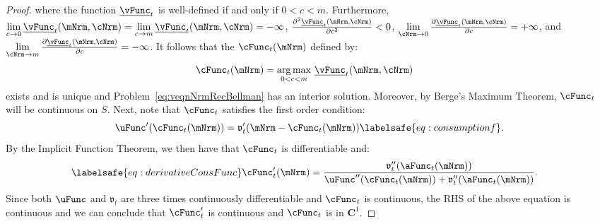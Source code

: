 \documentclass[\econtexRoot/BufferStockTheory]{subfiles}
\begin{document}
\begin{proof}
where the function $\underline{\vFunc}_{t}$ is well-defined if and only if $0<c<m$.
Furthermore,
$\lim\limits_{c \rightarrow
  0}\underline{\vFunc}_{t}(\mNrm,\cNrm)=\lim\limits_{c\rightarrow m} \underline{\vFunc}_{t}(\mNrm,\cNrm)=-\infty $, $\frac{\partial ^{2}\underline{\vFunc}_{t}(\mNrm,\cNrm)}{\partial c^{2}}%
<0$, $\lim\limits_{\cNrm \rightarrow 0}\frac{\partial \underline{\vFunc}_{t}(\mNrm,\cNrm)}{\partial c}%
=+\infty $, and $\lim\limits_{\cNrm\rightarrow m} \frac{\partial \underline{\vFunc}_{t}(\mNrm,\cNrm)}{%
  \partial c}=-\infty $.
It follows that the $\cFunc_{t}(\mNrm)$ defined by:
\begin{equation}\begin{gathered}\begin{aligned}
      \cFunc_{t}(\mNrm)  & = \underset{0<c<m}{\arg \max }~\underline{\vFunc}_{t}(\mNrm,\cNrm)
    \end{aligned}\end{gathered}\end{equation}
exists and is unique and Problem~\eqref{eq:veqnNrmRecBellman} has an interior
solution.
Moreover, by Berge's Maximum Theorem, $\cFunc_{t}$ will be continuous on $S$.
Next, note that $\cFunc_{t}$ satisfies the first order condition:
%
%
%
\begin{equation}
  \uFunc^{\prime }(\cFunc_{t}(\mNrm))=\mathfrak{v}_{t}^{\prime }(\mNrm-\cFunc_{t}(\mNrm))  \labelsafe{eq:consumptionf}.
\end{equation}
%
%
By the Implicit Function Theorem, we then have that $\cFunc_{t}$ is differentiable and:
%
%
\begin{equation}\labelsafe{eq:derivativeConsFunc}\begin{gathered}\begin{aligned}
      \cFunc_{t}^{\prime }(\mNrm)  & = \frac{\mathfrak{v}_{t}^{\prime \prime }({\aFunc}_{t}(\mNrm))  }{\uFunc^{\prime \prime }(\cFunc_{t}(\mNrm))+\mathfrak{v}_{t}^{\prime \prime }({\aFunc}_{t}(\mNrm))}.
    \end{aligned}\end{gathered}\end{equation}
%
%
Since both $\uFunc$ and $\mathfrak{v}_{t}$ are
three times continuously differentiable and $\cFunc_{t}$ is continuous, the RHS of the above equation is continuous and we can conclude that
$\cFunc_{t}^{\prime }$ is continuous and $\cFunc_{t}$ is in $\mathbf{C}^{1}$.



\end{proof}
\end{document}
